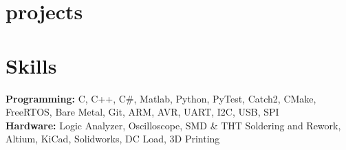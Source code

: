 \documentclass{article}
\begin{document}
\section{projects}


\section{Skills}
\textbf{Programming:} C, C++, C\#, Matlab, Python, PyTest, Catch2, CMake, FreeRTOS, Bare Metal, Git, ARM, AVR, UART, I2C, USB, SPI\\
\textbf{Hardware:} Logic Analyzer, Oscilloscope, SMD \& THT Soldering and Rework, Altium, KiCad, Solidworks, DC Load, 3D Printing\\
\end{document}
